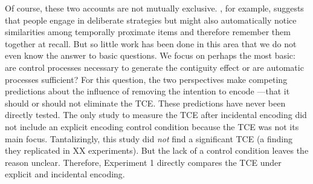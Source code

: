 \documentclass[man,natbib,floatsintext]{apa6} %
\begin{document}
Of course, these two accounts are not mutually exclusive. \citet{Hint16}, for example, suggests that people engage in deliberate strategies but might also automatically notice similarities among temporally proximate items and therefore remember them together at recall. But so little work has been done in this area that we do not even know the answer to basic questions. We focus on perhaps the most basic: are control processes necessary to generate the contiguity effect or are automatic processes sufficient? For this question, the two perspectives make competing predictions about the influence of removing the intention to encode ---that it should or should not eliminate the TCE. These predictions have never been directly tested. The only study to measure the TCE after incidental encoding \citep{NairEtal17} did not include an explicit encoding control condition because the TCE was not its main focus. Tantalizingly, this study did \emph{not} find a significant TCE (a finding they replicated in XX experiments). But the lack of a control condition leaves the reason unclear. Therefore, Experiment 1 directly compares the TCE under explicit and incidental encoding.












\end{document}
